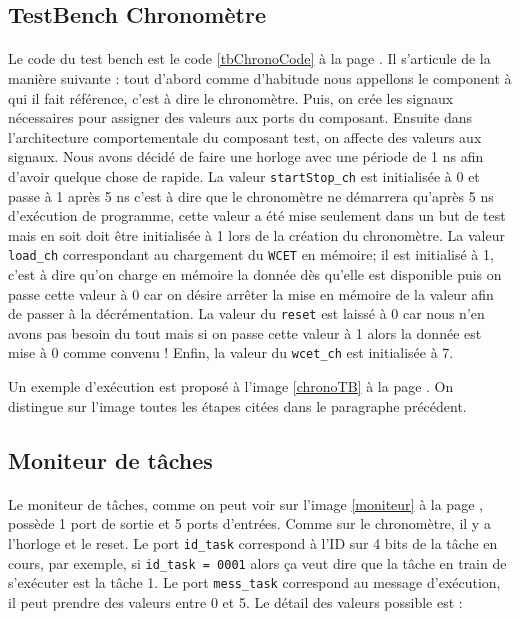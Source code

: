 \documentclass[a4paper,12pt]{report}
\begin{document}
			
		\subsection{TestBench Chronomètre}
			\paragraph*{}
			Le code du test bench est le code \ref{tbChronoCode} à la page \pageref{tbChronoCode}. Il s'articule de la manière suivante : tout d'abord comme d'habitude nous appellons le component à qui il fait référence, c'est à dire le chronomètre. Puis, on crée les signaux nécessaires pour assigner des valeurs aux ports du composant. Ensuite dans l'architecture comportementale du composant test, on affecte des valeurs aux signaux. Nous avons décidé de faire une horloge avec une période de 1 ns afin d'avoir quelque chose de rapide. La valeur \texttt{startStop\_ch} est initialisée à 0 et passe à 1 après 5 ns c'est à dire que le chronomètre ne démarrera qu'après 5 ns d'exécution de programme, cette valeur a été mise seulement dans un but de test mais en soit doit être initialisée à 1 lors de la création du chronomètre. La valeur \texttt{load\_ch} correspondant au chargement du \texttt{WCET} en mémoire; il est initialisé à 1, c'est à dire qu'on charge en mémoire la donnée dès qu'elle est disponible puis on passe cette valeur à 0 car on désire arrêter la mise en mémoire de la valeur afin de passer à la décrémentation. La valeur du \texttt{reset} est laissé à 0 car nous n'en avons pas besoin du tout mais si on passe cette valeur à 1 alors la donnée est mise à 0 comme convenu ! Enfin, la valeur du \texttt{wcet\_ch} est initialisée à 7.
			
			Un exemple d'exécution est proposé à l'image \ref{chronoTB} à la page \pageref{chronoTB}. On distingue sur l'image toutes les étapes citées dans le paragraphe précédent.
			
		\subsection{Moniteur de tâches}
			\paragraph*{}
			Le moniteur de tâches, comme on peut voir sur l'image \ref{moniteur} à la page \pageref{moniteur}, possède 1 port de sortie et 5 ports d'entrées. Comme sur le chronomètre, il y a l'horloge et le reset. Le port \texttt{id\_task} correspond à l'ID sur 4 bits de la tâche en cours, par exemple, si \verb|id_task = 0001| alors ça veut dire que la tâche en train de s'exécuter est la tâche 1. Le port \texttt{mess\_task} correspond au message d'exécution, il peut prendre des valeurs entre 0 et 5. Le détail des valeurs possible est :
			
\end{document}
